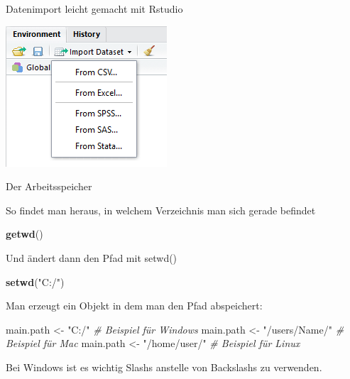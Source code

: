 \documentclass[ignorenonframetext,]{beamer}
\newenvironment{Shaded}{}{}
\newcommand{\KeywordTok}[1]{\textcolor[rgb]{0.00,0.44,0.13}{\textbf{{#1}}}}
\newcommand{\StringTok}[1]{\textcolor[rgb]{0.25,0.44,0.63}{{#1}}}
\newcommand{\CommentTok}[1]{\textcolor[rgb]{0.38,0.63,0.69}{\textit{{#1}}}}
\newcommand{\NormalTok}[1]{{#1}}
\begin{document}
\begin{frame}{Datenimport leicht gemacht mit Rstudio}

\includegraphics{./tex2pdf.956/746110b01ddf611ed8c07e15bb34f1ec7c4720f7.png}

\end{frame}

\begin{frame}[fragile]{Der Arbeitsspeicher}

So findet man heraus, in welchem Verzeichnis man sich gerade befindet

\begin{Shaded}
\begin{Highlighting}[]
\KeywordTok{getwd}\NormalTok{()}
\end{Highlighting}
\end{Shaded}

Und ändert dann den Pfad mit setwd()

\begin{Shaded}
\begin{Highlighting}[]
\KeywordTok{setwd}\NormalTok{(}\StringTok{"C:/"}\NormalTok{)}
\end{Highlighting}
\end{Shaded}

Man erzeugt ein Objekt in dem man den Pfad abspeichert:

\begin{Shaded}
\begin{Highlighting}[]
\NormalTok{main.path <-}\StringTok{ "C:/"} \CommentTok{# Beispiel für Windows}
\NormalTok{main.path <-}\StringTok{ "/users/Name/"} \CommentTok{# Beispiel für Mac}
\NormalTok{main.path <-}\StringTok{ "/home/user/"} \CommentTok{# Beispiel für Linux}
\end{Highlighting}
\end{Shaded}

Bei Windows ist es wichtig Slashs anstelle von Backslashs zu verwenden.

\end{frame}
\end{document}
